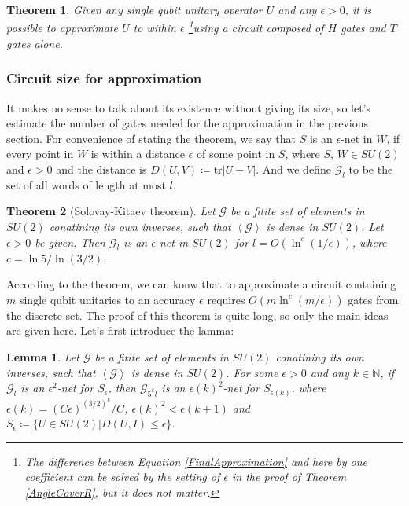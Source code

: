 \documentclass[a4paper,10pt]{article}
\newtheorem{theorem}{Theorem}[subsection]
\newtheorem{lemma}{Lemma}[subsection]
\numberwithin{equation}{subsection}
\begin{document}
\begin{theorem}
    Given any single qubit unitary operator $U$ and any $\epsilon > 0$, it is possible to approximate $U$ to within $\epsilon$ \footnote{The difference between Equation \ref{FinalApproximation} and here by one coefficient can be solved by the setting of $\epsilon$ in the proof of Theorem \ref{AngleCoverR}, but it does not matter. }using a circuit composed of $H$ gates and $T$ gates alone.
\end{theorem}



\subsubsection{Circuit size for approximation}

It makes no sense to talk about its existence without giving its size,  so let's estimate the number of gates needed for the approximation in the previous section. For convenience of stating the theorem, we say that $S$ is an $\epsilon$-net in $W$, if every point in $W$ is within a distance $\epsilon$ of some point in $S$, where $S$, $W\in SU(2)$ and $\epsilon>0$ and the distance is $D(U,V)\coloneqq\mathrm{tr}|U-V|$. And we define $\mathcal{G}_{l}$ to be the set of all words of length at most $l$.
\begin{theorem}[Solovay-Kitaev theorem]
    Let $\mathcal{G}$ be a fitite set of elements in $SU(2)$ conatining its own inverses, such that $\left\langle\mathcal{G}\right\rangle$ is dense in $SU(2)$. Let $\epsilon > 0$ be given. Then $\mathcal{G}_{l}$ is an $\epsilon$-net in $SU(2)$ for $l=O(\ln^{c}(1/\epsilon))$, where $c=\ln5/\ln(3/2)$.
\end{theorem}
According to the theorem, we can konw that to approximate a circuit containing $m$ single qubit unitaries to an accuracy $\epsilon$ requires $O(m\ln^{c}(m/\epsilon))$ gates from the discrete set. The proof of this theorem is quite long, so only the main ideas are given here. Let's first introduce the lamma:
\begin{lemma}
    Let $\mathcal{G}$ be a fitite set of elements in $SU(2)$ conatining its own inverses, such that $\left\langle\mathcal{G}\right\rangle$ is dense in $SU(2)$. For some $\epsilon>0$ and any $k\in\mathbb{N}$, if $\mathcal{G}_{l}$ is an $\epsilon^{2}$-net for $S_{\epsilon}$, then $\mathcal{G}_{5^{k}l}$ is an $\epsilon(k)^{2}$-net for $S_{\epsilon(k)}$. where $\epsilon(k)=(C\epsilon)^{(3/2)^{k}}/C$, $\epsilon(k)^{2}<\epsilon(k+1)$ and $S_{\epsilon}\coloneqq \{U\in SU(2)|D(U,I)\leq \epsilon\}$.
\end{lemma}
\end{document}
